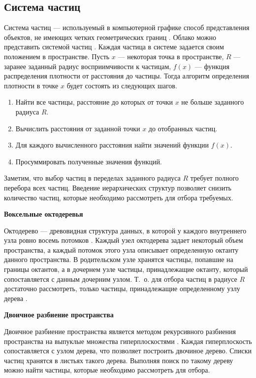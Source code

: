 \subsection{Система частиц}
\label{particles}
Система частиц --- используемый в компьютерной графике способ представления объектов, не имеющих четких геометрических границ \cite{particles1}. 
Облако можно представить системой частиц \cite{voxel}. Каждая частица в системе задается своим положением в пространстве. Пусть $x$ --- некоторая точка в пространстве, $R$ --- заранее заданный радиус восприимчивости к частицам, $f(x)$ --- функция распределения плотности от расстояния до частицы. Тогда алгоритм определения плотности в точке $x$ будет состоять из следующих шагов.

\begin{enumerate}
	\item Найти все частицы, расстояние до которых от точки $x$ не больше заданного радиуса $R$.
	\item Вычислить расстояния от заданной точки $x$ до отобранных частиц.
	\item Для каждого вычисленного расстояния найти значений функции $f(x)$.
	\item Просуммировать полученные значения функций.
\end{enumerate}

Заметим, что выбор частиц в переделах заданного радиуса $R$ требует полного перебора всех частиц. Введение иерархических структур позволяет снизить количество частиц, которые необходимо рассмотреть для отбора требуемых.


\textbf{Воксельные октодеревья}

Октодерево --- древовидная структура данных, в которой у каждого внутреннего узла ровно восемь потомков \cite{octree}.
Каждый узел октодерева задает некоторый объем пространства, а каждый потомок этого узла описывает определенную октанту данного пространства. 
В родительском узле хранятся частицы, попавшие на границы октантов, а в дочернем узле частицы, принадлежащие октанту, который сопоставляется с данным дочерним узлом. Т.~о. для отбора частиц в радиусе $R$ достаточно рассмотреть, только частицы, принадлежащие определенному узлу дерева \cite{clouds}. 

\textbf{Двоичное разбиение пространства}

Двоичное разбиение пространства является методом рекурсивного разбиения пространства на выпуклые множества гиперплоскостями \cite{neighbours}. Каждая гиперплоскость сопоставляется с узлом дерева, что позволяет построить двочиное дерево. Списки частиц хранятся в листьях такого дерева. Выполняя поиск по такому дереву можно найти частицы, которые необходимо рассмотреть для отбора.

